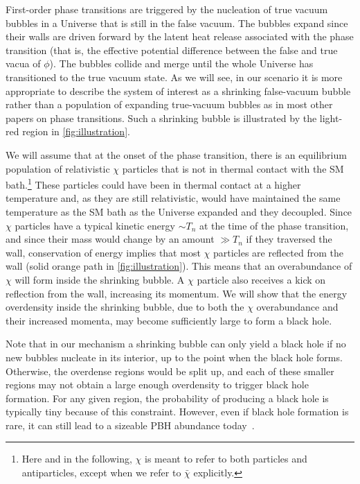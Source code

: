 \documentclass[
onecolumn, %
11pt, %
tightenlines,
superscriptaddress, %
nofootinbib, %
preprintnumbers, %
prd %
]{revtex4-1}
\begin{document}
First-order phase transitions are triggered by the nucleation of true vacuum bubbles in a Universe that is still in the false vacuum. The bubbles expand since their walls are driven forward by the latent heat release associated with the phase transition (that is, the effective potential difference between the false and true vacua of $\phi$). The bubbles collide and merge until the whole Universe has transitioned to the true vacuum state.  As we will see, in our scenario it is more appropriate to describe the system of interest as a shrinking false-vacuum bubble rather than a population of expanding true-vacuum bubbles as in most other papers on phase transitions. Such a shrinking bubble is illustrated by the light-red region in \cref{fig:illustration}.

We will assume that at the onset of the phase transition, there is an equilibrium population of relativistic $\chi$ particles that is not in thermal contact with the SM bath.\footnote{Here and in the following, $\chi$ is meant to refer to both particles and antiparticles, except when we refer to $\bar\chi$ explicitly.}  These particles could have been in thermal contact at a higher temperature and, as they are still relativistic, would have maintained the same temperature as the SM bath as the Universe expanded and they decoupled.  Since $\chi$ particles have a typical kinetic energy $\sim T_n$ at the time of the phase transition, and since their mass would change by an amount $\gg T_n$ if they traversed the wall, conservation of energy implies that most $\chi$ particles are reflected from the wall (solid orange path in \cref{fig:illustration}).  This means that an overabundance of $\chi$ will form inside the shrinking bubble. A $\chi$ particle also receives a kick on reflection from the wall, increasing its momentum.  We will show that the energy overdensity inside the shrinking bubble, due to both the $\chi$ overabundance and their increased momenta, may become sufficiently large to form a black hole.

Note that in our mechanism a shrinking bubble can only yield a black hole if no new bubbles nucleate in its interior, up to the point when the black hole forms. Otherwise, the overdense regions would be split up, and each of these smaller regions may not obtain a large enough overdensity to trigger black hole formation.  For any given region, the probability of producing a black hole is typically tiny because of this constraint.  However, even if black hole formation is rare, it can still lead to a sizeable PBH abundance today~\cite{Baker:2021nyl}.
\end{document}
